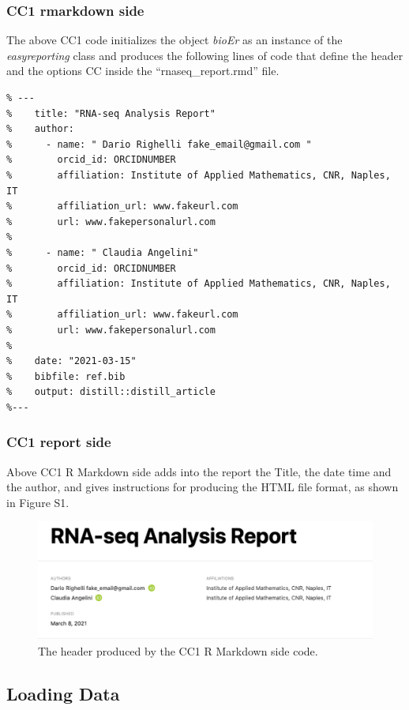 \documentclass[
]{article}
\begin{document}
\hypertarget{cc1-rmarkdown-side}{%
\subsubsection{CC1 rmarkdown side}\label{cc1-rmarkdown-side}}

The above CC1 code initializes the object \emph{bioEr} as an instance of
the \emph{easyreporting} class and produces the following lines of code
that define the header and the options CC inside the
``rnaseq\_report.rmd'' file.

\begin{verbatim}
% ---
%    title: "RNA-seq Analysis Report"
%    author: 
%      - name: " Dario Righelli fake_email@gmail.com "
%        orcid_id: ORCIDNUMBER
%        affiliation: Institute of Applied Mathematics, CNR, Naples, IT
%        affiliation_url: www.fakeurl.com
%        url: www.fakepersonalurl.com
%
%      - name: " Claudia Angelini"
%        orcid_id: ORCIDNUMBER
%        affiliation: Institute of Applied Mathematics, CNR, Naples, IT
%        affiliation_url: www.fakeurl.com
%        url: www.fakepersonalurl.com
%
%    date: "2021-03-15"
%    bibfile: ref.bib
%    output: distill::distill_article
%---
\end{verbatim}

\hypertarget{cc1-report-side}{%
\subsubsection{CC1 report side}\label{cc1-report-side}}

Above CC1 R Markdown side adds into the report the Title, the date time
and the author, and gives instructions for producing the HTML file
format, as shown in Figure S1.

\begin{figure}
\centering
\includegraphics{imgs/1.png}
\caption{The header produced by the CC1 R Markdown side code.}
\end{figure}

\hypertarget{loading-data}{%
\subsection{Loading Data}\label{loading-data}}
\end{document}
